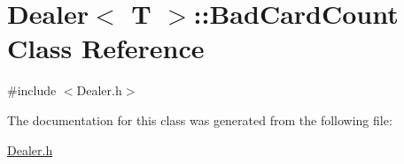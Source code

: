 \hypertarget{class_dealer_1_1_bad_card_count}{}\section{Dealer$<$ T $>$\+:\+:Bad\+Card\+Count Class Reference}
\label{class_dealer_1_1_bad_card_count}


{\ttfamily \#include $<$Dealer.\+h$>$}



The documentation for this class was generated from the following file\+:\begin{DoxyCompactItemize}
\item 
\mbox{\hyperlink{_dealer_8h}{Dealer.\+h}}\end{DoxyCompactItemize}
